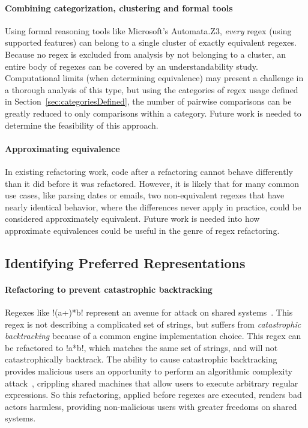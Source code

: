 \paragraph{Combining categorization, clustering and formal tools}  Using formal reasoning tools like Microsoft's Automata.Z3, \emph{every} regex (using supported features) can belong to a single cluster of exactly equivalent regexes. Because no regex is excluded from analysis by not belonging to a cluster, an entire body of regexes can be covered by an understandability study.
Computational limits (when determining equivalence) may present a challenge in a thorough analysis of this type, but using the categories of regex usage defined in Section~\ref{sec:categoriesDefined}, the number of pairwise comparisons can be greatly reduced to only comparisons within a category.  Future work is needed to determine the feasibility of this approach.

\paragraph{Approximating equivalence}  In existing refactoring work, code after a refactoring cannot behave differently than it did before it was refactored.  However, it is likely that for many common use cases, like parsing dates or emails, two non-equivalent regexes that have nearly identical behavior, where the differences never apply in practice, could be considered approximately equivalent.  Future work is needed into how approximate equivalences could be useful in the genre of regex refactoring.

\subsection{Identifying Preferred Representations}
\paragraph{Refactoring to prevent catastrophic backtracking}  Regexes like \cverb!(a+)*b! represent an avenue for attack on shared systems~.  This regex is not describing a complicated set of strings, but suffers from \emph{catastrophic backtracking} because of a common engine implementation choice.  This regex can be refactored to \cverb!a*b!, which matches the same set of strings, and will not catastrophically backtrack.  The ability to cause catastrophic backtracking provides malicious users an opportunity to perform an algorithmic complexity attack~, crippling shared machines that allow users to execute arbitrary regular expressions.  So this refactoring, applied before regexes are executed, renders bad actors harmless, providing non-malicious users with greater freedoms on shared systems.

